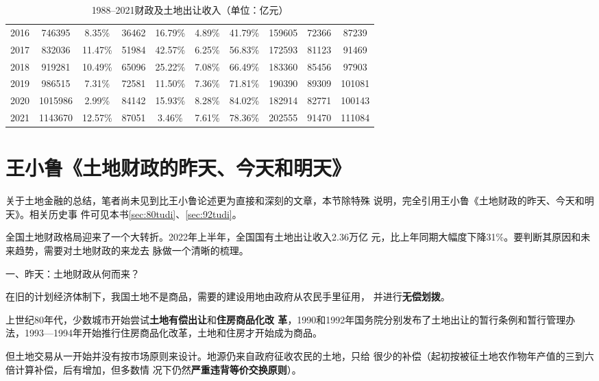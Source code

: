 \begin{table}[p]
{\begin{tabular}{@{}cccccccccc@{}}
2016 & 746395  & 8.35\%  & 36462 & 16.79\%   & 4.89\% & 41.79\% & 159605 & 72366 & 87239  \\
2017 & 832036  & 11.47\% & 51984 & 42.57\%   & 6.25\% & 56.83\% & 172593 & 81123 & 91469  \\
2018 & 919281  & 10.49\% & 65096 & 25.22\%   & 7.08\% & 66.49\% & 183360 & 85456 & 97903  \\
2019 & 986515  & 7.31\%  & 72581 & 11.50\%   & 7.36\% & 71.81\% & 190390 & 89309 & 101081 \\
2020 & 1015986 & 2.99\%  & 84142 & 15.93\%   & 8.28\% & 84.02\% & 182914 & 82771 & 100143 \\
2021 & 1143670 & 12.57\% & 87051 & 3.46\%    & 7.61\% & 78.36\% & 202555 & 91470 & 111084 \\ \bottomrule
\end{tabular}%
}
\caption{1988--2021财政及土地出让收入（单位：亿元）}
\label{tab:19882021}
\end{table}

\section{王小鲁《土地财政的昨天、今天和明天》}

关于土地金融的总结，笔者尚未见到比王小鲁论述更为直接和深刻的文章，本节除特殊
说明，完全引用王小鲁《土地财政的昨天、今天和明天》\cite{wxljintian}。相关历史事
件可见本书\cref{sec:80tudi}、\cref{sec:92tudi}。

全国土地财政格局迎来了一个大转折。2022年上半年，全国国有土地出让收入2.36万亿
元，比上年同期大幅度下降31\%。要判断其原因和未来趋势，需要对土地财政的来龙去
脉做一个清晰的梳理。

{\heiti 一、昨天：土地财政从何而来？}

在旧的计划经济体制下，我国土地不是商品，需要的建设用地由政府从农民手里征用，
并进行\textbf{无偿划拨}。

上世纪80年代，少数城市开始尝试\textbf{土地有偿出让}和\textbf{住房商品化改
  革}，1990和1992年国务院分别发布了土地出让的暂行条例和暂行管理办
法，1993—1994年开始推行住房商品化改革，土地和住房才开始成为商品。

但土地交易从一开始并没有按市场原则来设计。地源仍来自政府征收农民的土地，只给
很少的补偿（起初按被征土地农作物年产值的三到六倍计算补偿，后有增加，但多数情
况下仍然\textbf{严重违背等价交换原则}）。

